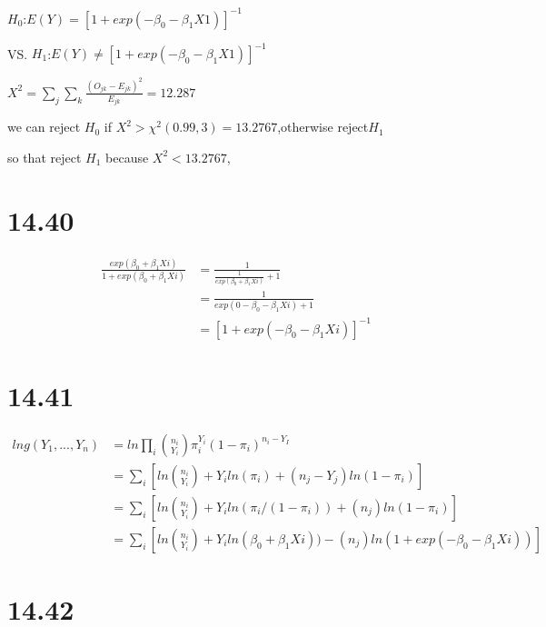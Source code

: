 \documentclass{article}\usepackage[]{graphicx}\usepackage[]{color}
\begin{document}
\begin{center}
$H_0$:$E(Y)=[1+exp(-\beta_0-\beta_1 X1)]^{-1}$

VS. $H_1$:$E(Y)  \ne [1+exp(-\beta_0-\beta_1 X1)]^{-1}$

$X^2=\sum_j \sum_k \frac{(O_{jk}-E_{jk})^2}{E_{jk}} = 12.287$

we can reject $H_0$ if $X^2 > \chi^2(0.99, 3)=13.2767$,otherwise reject$H_1$

so that reject $H_1$ because $X^2 <13.2767$, 
\end{center}



\section{14.40}

\begin{displaymath}
\begin{split}
  \frac{exp(\beta_0+\beta_1 Xi)}{1+exp(\beta_0+\beta_1 Xi)} &= \frac{1}{\frac{1}{exp(\beta_0+\beta_1 Xi)}+1} \\
    &= \frac{1}{exp(0-\beta_0-\beta_1 Xi) + 1} \\
    &= [1+exp(-\beta_0-\beta_1 Xi)]^{-1}
\end{split}
\end{displaymath}

\section{14.41}

\begin{displaymath}
\begin{split}
  ln g(Y_1, ..., Y_n) &= ln \prod_i \binom{n_i}{Y_i} \pi_i^{Y_i} (1-\pi_i)^{n_i-Y_I}  \\
                      &= \sum_i[ ln\binom{n_i}{Y_i} + Y_i ln(\pi_i) + (n_j-Y_j) ln (1-\pi_i) ] \\
                      &= \sum_i[ ln\binom{n_i}{Y_i} + Y_i ln(\pi_i/(1-\pi_i)) + (n_j) ln (1-\pi_i)] \\
                      &= \sum_i[ln\binom{n_i}{Y_i} + Y_i ln(\beta_0+\beta_1 Xi)) - (n_j) ln (1+exp(-\beta_0-\beta_1 Xi))]
\end{split}
\end{displaymath}

\section{14.42}
\end{document}
